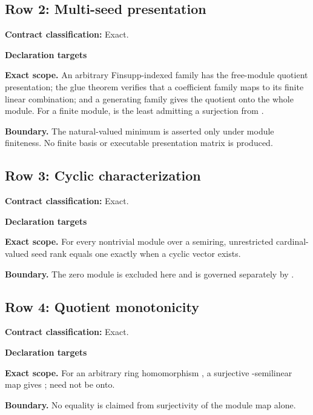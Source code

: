 \subsection{Row 2: Multi-seed presentation}
\label{row:2}
\textbf{Contract classification:} Exact.
\par\smallskip\textbf{Declaration targets}\par
{\small\noindent{}\par}
{\small\noindent{}\par}
{\small\noindent{}\par}
{\small\noindent{}\par}
\medskip\noindent\textbf{Exact scope.} An arbitrary Finsupp-indexed family has the free-module quotient presentation; the glue theorem verifies that a coefficient family maps to its finite linear combination; and a generating family gives the quotient onto the whole module. For a finite module,  is the least  admitting a surjection from .
\par\smallskip\noindent\textbf{Boundary.} The natural-valued minimum is asserted only under module finiteness. No finite basis or executable presentation matrix is produced.
\medskip
\subsection{Row 3: Cyclic characterization}
\label{row:3}
\textbf{Contract classification:} Exact.
\par\smallskip\textbf{Declaration targets}\par
{\small\noindent{}\par}
\medskip\noindent\textbf{Exact scope.} For every nontrivial module over a semiring, unrestricted cardinal-valued seed rank equals one exactly when a cyclic vector exists.
\par\smallskip\noindent\textbf{Boundary.} The zero module is excluded here and is governed separately by .
\medskip
\subsection{Row 4: Quotient monotonicity}
\label{row:4}
\textbf{Contract classification:} Exact.
\par\smallskip\textbf{Declaration targets}\par
{\small\noindent{}\par}
\medskip\noindent\textbf{Exact scope.} For an arbitrary ring homomorphism , a surjective -semilinear map gives ;  need not be onto.
\par\smallskip\noindent\textbf{Boundary.} No equality is claimed from surjectivity of the module map alone.
\medskip
